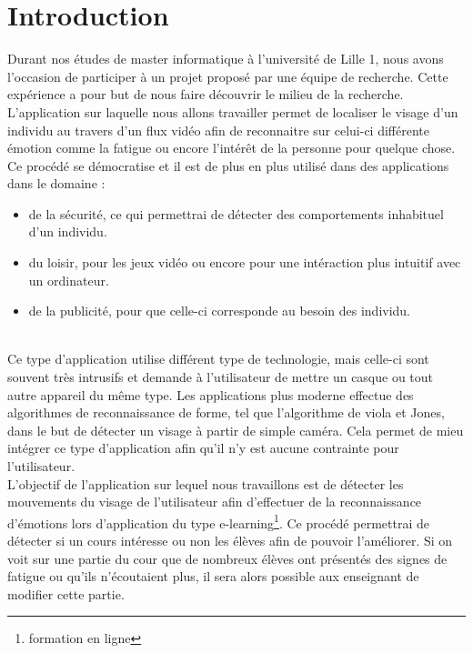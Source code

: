 \section{Introduction}

Durant nos études de master informatique à l'université de Lille 1,
nous avons l'occasion de participer à un projet proposé par une équipe de
recherche. Cette expérience a pour but de nous faire découvrir le
milieu de la recherche.\\

L'application sur laquelle nous allons travailler permet de localiser le visage
d'un individu au travers d'un flux vidéo afin de reconnaitre sur celui-ci différente
émotion comme la fatigue ou encore l'intérêt de la personne pour quelque chose. Ce procédé
se démocratise et il est de plus en plus utilisé dans des applications dans le domaine : 
\begin{itemize}
 \item de la sécurité, ce qui permettrai de détecter des comportements inhabituel d'un individu.
 \item du loisir, pour les jeux vidéo ou encore pour une intéraction plus intuitif avec un ordinateur.
 \item de la publicité, pour que celle-ci corresponde au besoin des individu. 
\end{itemize}
\ \\
Ce type d'application utilise différent type de technologie, mais celle-ci sont souvent très intrusifs 
et demande à l'utilisateur de mettre un casque ou tout autre appareil du même type. Les applications plus 
moderne effectue des algorithmes de reconnaissance de forme, tel que l'algorithme de viola et Jones, dans 
le but de détecter un visage à partir de simple caméra. Cela permet de mieu intégrer ce type d'application 
afin qu'il n'y est aucune contrainte pour l'utilisateur.\\

L'objectif de l'application sur lequel nous travaillons est de détecter les mouvements
du visage de l'utilisateur afin d'effectuer de la reconnaissance d'émotions lors d'application
du type e-learning\footnote{formation en ligne}. Ce procédé permettrai de détecter si un cours 
intéresse ou non les élèves afin de pouvoir l'améliorer. Si on voit sur une partie du cour
que de nombreux élèves ont présentés des signes de fatigue ou qu'ils n'écoutaient plus, il sera
alors possible aux enseignant de modifier cette partie.


